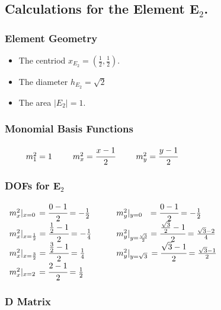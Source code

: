 \documentclass{article}
\begin{document}
\subsection{Calculations for the Element E$_2$.}

\subsubsection{Element Geometry}
\begin{itemize}
    \item The centriod $x_{E_2} = (\frac{1}{2}, \frac{1}{2}).$
    \item The diameter $ h_{E_2} = \sqrt{2}$
    \item The area $|E_2| = 1$.
\end{itemize}


\subsubsection{Monomial Basis Functions}
$
\noindent\hspace*{25pt} m_1^2 = 1\\
\hspace*{25pt} m_x^2 = \cfrac{x-1}{2}\\
\hspace*{25pt} m_y^2 = \cfrac{y-1}{2}
$

\subsubsection{DOFs for E$_2$}
$\begin{array}{ll}
m_x^2|_{x=0}\hspace{1.5pt} = \cfrac{0-1}{2} = -\frac{1}{2} &\qquad m_y^2|_{y=0} \hspace{7pt}= \cfrac{0-1}{2} = -\frac{1}{2} \\
m_x^2|_{x=\frac{1}{2}} = \cfrac{\frac{1}{2}-1}{2} = -\frac{1}{4} &\qquad m_y^2|_{y=\frac{\sqrt{3}}{2}} = \cfrac{\frac{\sqrt{3}}{2}-1}{2} = \frac{\sqrt{3}-2}{4} \\
m_x^2|_{x=\frac{3}{2}} = \cfrac{\frac{3}{2}-1}{2} = \frac{1}{4} &\qquad m_y^2|_{y=\sqrt{3}}\, = \cfrac{\sqrt{3}-1}{2} = \frac{\sqrt{3}-1}{2} \\
m_x^2|_{x=2}\hspace{1.5pt} = \cfrac{2-1}{2} = \frac{1}{2} &
\end{array}$

\subsubsection{D Matrix}
\end{document}
